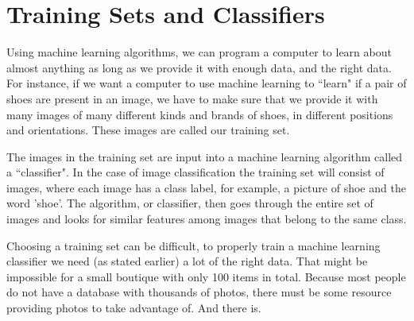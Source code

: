 \documentclass[12pt]{report} %
\begin{document}
\section{Training Sets and Classifiers}
	Using machine learning algorithms, we can program a computer to learn about almost anything as long as we provide it with enough data, and the right data. For instance, if we want a computer to use machine learning to ``learn" if a pair of shoes are present in an image, we have to make sure that we provide it with many images of many different kinds and brands of shoes, in different positions and orientations. These images are called our training set\cite{aurelienMachineLearning}. 
	
	The images in the training set are input into a machine learning algorithm called a ``classifier"\cite{KubatMachineLearn}. In the case of image classification the training set will consist of images, where each image has a class label, for example, a picture of shoe and the word 'shoe'. The algorithm, or classifier, then goes through the entire set of images and looks for similar features among images that belong to the same class. 
	
	Choosing a training set can be difficult, to properly train a machine learning classifier we need (as stated earlier) a lot of the right data. That might be impossible for a small boutique 
with only 100 items in total. Because most people do not have a database with thousands of photos, there must be some resource providing photos to take advantage of. And there is. 
\end{document}

